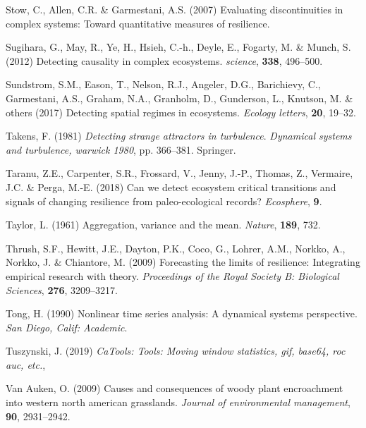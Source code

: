 \documentclass[12pt,twoside,openany]{reedthesis}
\begin{document}
\leavevmode\hypertarget{ref-stow2007evaluating}{}%
Stow, C., Allen, C.R. \& Garmestani, A.S. (2007) Evaluating discontinuities in complex systems: Toward quantitative measures of resilience.

\leavevmode\hypertarget{ref-sugihara2012detecting}{}%
Sugihara, G., May, R., Ye, H., Hsieh, C.-h., Deyle, E., Fogarty, M. \& Munch, S. (2012) Detecting causality in complex ecosystems. \emph{science}, \textbf{338}, 496--500.

\leavevmode\hypertarget{ref-sundstrom2017detecting}{}%
Sundstrom, S.M., Eason, T., Nelson, R.J., Angeler, D.G., Barichievy, C., Garmestani, A.S., Graham, N.A., Granholm, D., Gunderson, L., Knutson, M. \& others (2017) Detecting spatial regimes in ecosystems. \emph{Ecology letters}, \textbf{20}, 19--32.

\leavevmode\hypertarget{ref-takens1981detecting}{}%
Takens, F. (1981) \emph{Detecting strange attractors in turbulence}. \emph{Dynamical systems and turbulence, warwick 1980}, pp. 366--381. Springer.

\leavevmode\hypertarget{ref-taranu2018can}{}%
Taranu, Z.E., Carpenter, S.R., Frossard, V., Jenny, J.-P., Thomas, Z., Vermaire, J.C. \& Perga, M.-E. (2018) Can we detect ecosystem critical transitions and signals of changing resilience from paleo-ecological records? \emph{Ecosphere}, \textbf{9}.

\leavevmode\hypertarget{ref-taylor1961aggregation}{}%
Taylor, L. (1961) Aggregation, variance and the mean. \emph{Nature}, \textbf{189}, 732.

\leavevmode\hypertarget{ref-thrush2009forecasting}{}%
Thrush, S.F., Hewitt, J.E., Dayton, P.K., Coco, G., Lohrer, A.M., Norkko, A., Norkko, J. \& Chiantore, M. (2009) Forecasting the limits of resilience: Integrating empirical research with theory. \emph{Proceedings of the Royal Society B: Biological Sciences}, \textbf{276}, 3209--3217.

\leavevmode\hypertarget{ref-tong1990nonlinear}{}%
Tong, H. (1990) Nonlinear time series analysis: A dynamical systems perspective. \emph{San Diego, Calif: Academic}.

\leavevmode\hypertarget{ref-caTools}{}%
Tuszynski, J. (2019) \emph{CaTools: Tools: Moving window statistics, gif, base64, roc auc, etc.},

\leavevmode\hypertarget{ref-van2009causes}{}%
Van Auken, O. (2009) Causes and consequences of woody plant encroachment into western north american grasslands. \emph{Journal of environmental management}, \textbf{90}, 2931--2942.
\end{document}
